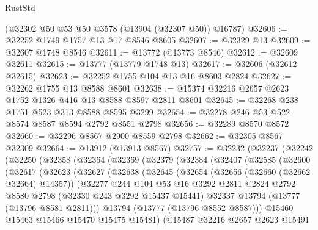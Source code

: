 \begin{lexlean}{RustStd}
\begin{coremodule}
    (@32302 @50 @53 @50 @3578 (@13904 (@32307 @50)) @16787)
@32606 := @32252 @1749 @1757 @13 @17 @8546 @8605
@32607 := @32329 @13
@32609 := @32607 @1748 @8546
@32611 := @13772 (@13773 @8546)
@32612 := @32609 @32611
@32615 := @13777 (@13779 @1748 @13)
@32617 := @32606 (@32612 @32615)
@32623 := @32252 @1755 @104 @13 @16 @8603 @2824
@32627 := @32262 @1755 @13 @8588 @8601
@32638 := @15374 @32216 @2657 @2623 @1752 @1326 @416 @13 @8588 @8597 @2811 @8601
@32645 := @32268 @238 @1751 @523 @313 @8588 @8595 @3299
@32654 := @32278 @246 @53 @522 @8574 @8587 @8594 @2792 @8551 @2798
@32656 := @32289 @8570 @8572
@32660 := @32296 @8567 @2900 @8559 @2798
@32662 := @32305 @8567 @32309
@32664 := @13912 (@13913 @8567)
@32757 := @32232
    (@32237
      (@32242
        (@32250
          (@32358
            (@32364
              (@32369
                (@32379
                  (@32384
                    (@32407
                      (@32585
                        (@32600
                          (@32617
                            (@32623
                              (@32627
                                (@32638
                                  (@32645
                                    (@32654
                                      (@32656 (@32660 (@32662 @32664) @14357))
                                      (@32277
                                        @244
                                        @104
                                        @53
                                        @16
                                        @3292
                                        @2811
                                        @2824
                                        @2792
                                        @8580
                                        @2798
                                        (@32330 @243 @3292 @15437 @15441)
                                        @32337
                                        @13794
                                        (@13777 (@13796 @8581 @2811)))
                                      @13794
                                      (@13777 (@13796 @8552 @8587)))
                                    @15460
                                    @15463
                                    @15466
                                    @15470
                                    @15475
                                    @15481)
                                  (@15487
                                    @32216
                                    @2657
                                    @2623
                                    @15491

\end{coremodule}
\end{lexlean}
